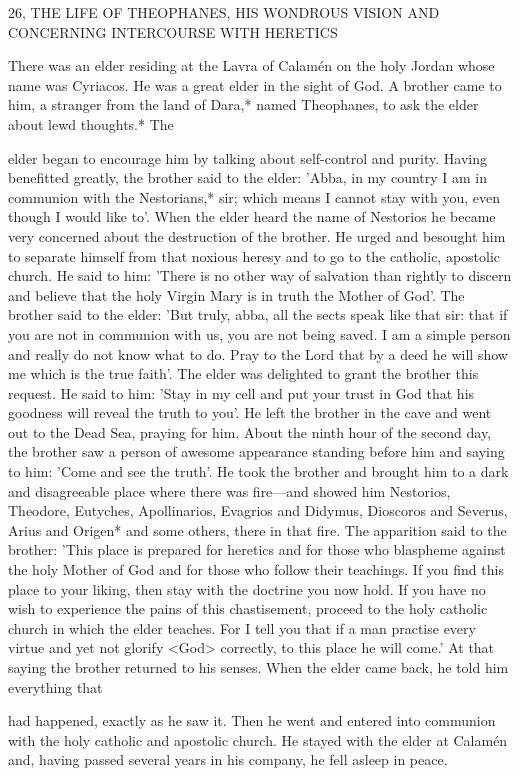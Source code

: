26, THE LIFE OF THEOPHANES,
HIS WONDROUS VISION
AND CONCERNING INTERCOURSE WITH HERETICS

There was an elder residing at the Lavra of Calamén on the holy
Jordan whose name was Cyriacos. He was a great elder in the sight
of God. A brother came to him, a stranger from the land of Dara,*
named Theophanes, to ask the elder about lewd thoughts.* The

elder began to encourage him by talking about self-control and
purity. Having benefitted greatly, the brother said to the elder:
'Abba, in my country I am in communion with the Nestorians,* sir;
which means I cannot stay with you, even though I would like to'.
When the elder heard the name of Nestorios he became very
concerned about the destruction of the brother. He urged and
besought him to separate himself from that noxious heresy and to
go to the catholic, apostolic church. He said to him: 'There is no
other way of salvation than rightly to discern and believe that the
holy Virgin Mary is in truth the Mother of God'. The brother said
to the elder: 'But truly, abba, all the sects speak like that sir: that if
you are not in communion with us, you are not being saved. I am
a simple person and really do not know what to do. Pray to the
Lord that by a deed he will show me which is the true faith'. The
elder was delighted to grant the brother this request. He said to him:
'Stay in my cell and put your trust in God that his goodness will
reveal the truth to you'. He left the brother in the cave and went
out to the Dead Sea, praying for him. About the ninth hour of the
second day, the brother saw a person of awesome appearance
standing before him and saying to him: 'Come and see the truth'.
He took the brother and brought him to a dark and disagreeable
place where there was fire—and showed him Nestorios, Theodore,
Eutyches, Apollinarios, Evagrios and Didymus, Dioscoros and
Severus, Arius and Origen* and some others, there in that fire. The
apparition said to the brother: 'This place is prepared for heretics
and for those who blaspheme against the holy Mother of God and
for those who follow their teachings. If you find this place to your
liking, then stay with the doctrine you now hold. If you have no
wish to experience the pains of this chastisement, proceed to the
holy catholic church in which the elder teaches. For I tell you that
if a man practise every virtue and yet not glorify <God> correctly,
to this place he will come.' At that saying the brother returned to
his senses. When the elder came back, he told him everything that

had happened, exactly as he saw it. Then he went and entered into
communion with the holy catholic and apostolic church. He stayed
with the elder at Calamén and, having passed several years in his
company, he fell asleep in peace.

